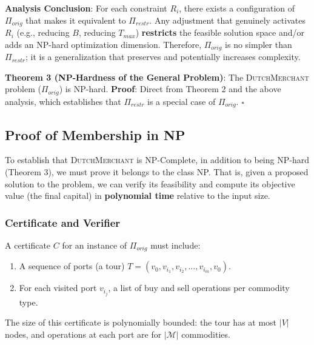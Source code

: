 \documentclass{article} \usepackage[english]{babel} \usepackage[utf8]{inputenc}
\begin{document}
\textbf{Analysis Conclusion}: For each constraint $R_i$, there exists a
configuration of $\Pi_{orig}$ that makes it equivalent to $\Pi_{restr}$. Any
adjustment that genuinely activates $R_i$ (e.g., reducing $B$, reducing
$T_{max}$) \textbf{restricts} the feasible solution space and/or adds an NP-hard
optimization dimension. Therefore, $\Pi_{orig}$ is no simpler than $\Pi_{restr}$;
it is a generalization that preserves and potentially increases complexity.

\textbf{Theorem 3 (NP-Hardness of the General Problem)}: The
\textsc{DutchMerchant} problem ($\Pi_{orig}$) is NP-hard. \textbf{Proof}: Direct
from Theorem 2 and the above analysis, which establishes that $\Pi_{restr}$ is a
special case of $\Pi_{orig}$. \hfill $\square$

\subsection{Proof of Membership in NP} \label{subsec:membership_np}

To establish that \textsc{DutchMerchant} is NP-Complete, in addition to being
NP-hard (Theorem 3), we must prove it belongs to the class NP. That is, given a
proposed solution to the problem, we can verify its feasibility and compute its
objective value (the final capital) in \textbf{polynomial time} relative to the
input size.

\subsubsection*{Certificate and Verifier} A certificate $C$ for an instance of
$\Pi_{orig}$ must include: \begin{enumerate} \item A sequence of ports (a tour)
$T = (v_0, v_{i_1}, v_{i_2}, ..., v_{i_m}, v_0)$. \item For each visited port
$v_{i_j}$, a list of buy and sell operations per commodity type. \end{enumerate}

The size of this certificate is polynomially bounded: the tour has at most
$|V|$ nodes, and operations at each port are for $|\mathcal{M}|$ commodities.
\end{document}
